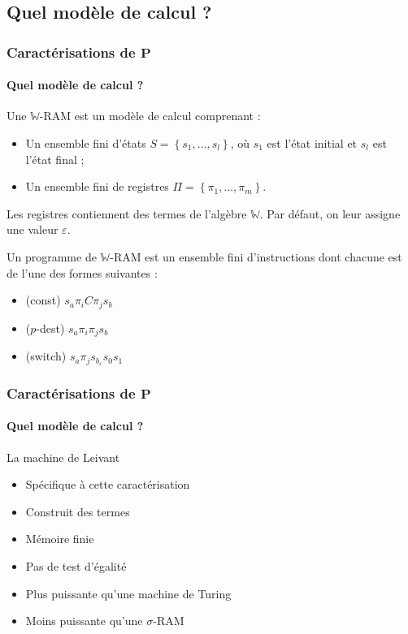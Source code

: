 \documentclass[10pt]{beamer}
\newcommand{\bbW}{\mathbb{W}}
\begin{document}
	
	\subsection{Quel modèle de calcul ?}
	
	\begin{frame}
		\frametitle{Caractérisations de $\textbf{P}$}
		\framesubtitle{Quel modèle de calcul ?}
		
		\begin{defn}
			
			Une $\bbW$-RAM est un modèle de calcul comprenant :
			\begin{itemize}[itemsep=-1mm]
				\item 	Un ensemble fini d'états $S = \left\lbrace s_1, \dots, s_l \right\rbrace$, où $s_1$ est l'état initial et $s_l$ est l'état final ;
				\item 	Un ensemble fini de registres $\Pi = \left\lbrace \pi_1, \dots, \pi_m \right\rbrace$.
			\end{itemize}
			
			Les registres contiennent des termes de l'algèbre $\bbW$. Par défaut, on leur assigne une valeur $\varepsilon$.
			
			Un programme de $\bbW$-RAM est un ensemble fini d'instructions dont chacune est de l'une des formes suivantes :
			
			\begin{itemize}[itemsep=-1mm]
				\item 	(const)			$s_a \pi_{i} C \pi_j s_b$
				\item	($p$-dest)		$s_a \pi_i \pi_j s_b$
				\item	(switch)		$s_a \pi_j s_{b_{\varepsilon}} s_{0} s_{1}$
			\end{itemize}
		\end{defn}
	\end{frame}
	
	
	\begin{frame}
		\frametitle{Caractérisations de $\textbf{P}$}
		\framesubtitle{Quel modèle de calcul ?}
		
		\begin{block}{La machine de Leivant}
			\begin{itemize}
				\item 	Spécifique à cette caractérisation
				\item 	Construit des termes
				\item 	Mémoire finie
				\item 	Pas de test d'égalité
				\item 	Plus puissante qu'une machine de Turing
				\item 	Moins puissante qu'une $\sigma$-RAM %
			\end{itemize}
		\end{block}
	\end{frame}
	
\end{document}
